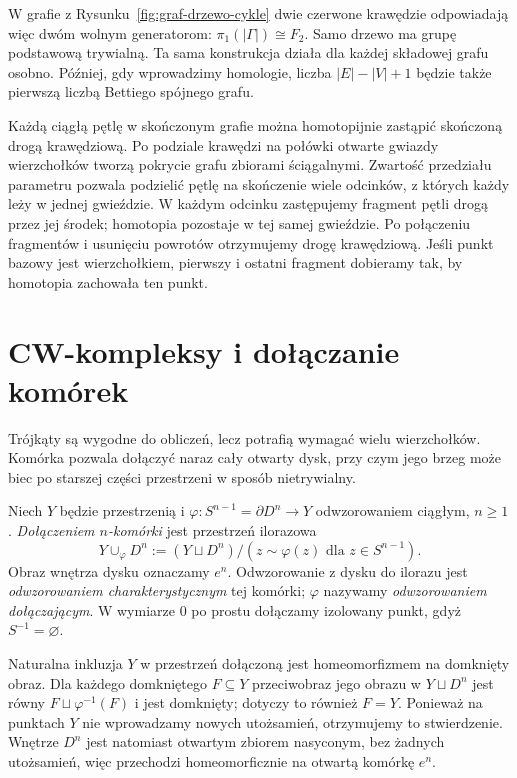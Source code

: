 W grafie z Rysunku~\ref{fig:graf-drzewo-cykle} dwie czerwone
krawędzie odpowiadają więc dwóm wolnym generatorom:
$\pi_1(|\Gamma|)\cong F_2$. Samo drzewo ma grupę
podstawową trywialną. Ta sama konstrukcja działa dla
każdej składowej grafu osobno. Później, gdy wprowadzimy
homologie, liczba $|E|-|V|+1$ będzie także pierwszą liczbą
Bettiego spójnego grafu.

Każdą ciągłą pętlę w skończonym grafie można homotopijnie
zastąpić skończoną drogą krawędziową. Po podziale krawędzi
na połówki otwarte gwiazdy wierzchołków tworzą pokrycie
grafu zbiorami ściągalnymi. Zwartość przedziału parametru
pozwala podzielić pętlę na skończenie wiele odcinków, z
których każdy leży w jednej gwieździe. W każdym odcinku
zastępujemy fragment pętli drogą przez jej środek; homotopia
pozostaje w tej samej gwieździe. Po połączeniu fragmentów
i usunięciu powrotów otrzymujemy drogę krawędziową.
Jeśli punkt bazowy jest wierzchołkiem, pierwszy i ostatni
fragment dobieramy tak, by homotopia zachowała ten punkt.

\section{CW-kompleksy i dołączanie komórek}
\label{sec:cw-kompleksy}

Trójkąty są wygodne do obliczeń, lecz
potrafią wymagać wielu wierzchołków.
Komórka pozwala dołączyć naraz cały
otwarty dysk, przy czym jego brzeg
może biec po starszej części przestrzeni
w sposób nietrywialny.

\begin{definicja}
\label{def:dolaczenie-komorki}
Niech $Y$ będzie przestrzenią i
$\varphi:S^{n-1}=\partial D^n\to Y$
odwzorowaniem ciągłym, $n\geq1$.
\emph{Dołączeniem $n$-komórki} jest
przestrzeń ilorazowa
\[
 Y\cup_\varphi D^n
 :=(Y\sqcup D^n)/(z\sim\varphi(z)
 \text{ dla }z\in S^{n-1}).
\]
Obraz wnętrza dysku oznaczamy $e^n$.
Odwzorowanie z dysku do ilorazu jest
\emph{odwzorowaniem charakterystycznym}
tej komórki; $\varphi$ nazywamy
\emph{odwzorowaniem dołączającym}.
W wymiarze $0$ po prostu dołączamy
izolowany punkt, gdyż
$S^{-1}=\varnothing$.
\end{definicja}

Naturalna inkluzja $Y$ w przestrzeń dołączoną jest
homeomorfizmem na domknięty obraz. Dla każdego domkniętego $F\subseteq Y$
przeciwobraz jego obrazu w $Y\sqcup D^n$ jest równy
$F\sqcup\varphi^{-1}(F)$ i jest domknięty; dotyczy to również $F=Y$.
Ponieważ na punktach $Y$ nie wprowadzamy nowych utożsamień,
otrzymujemy to stwierdzenie. Wnętrze $D^n$ jest natomiast
otwartym zbiorem nasyconym, bez żadnych utożsamień, więc przechodzi
homeomorficznie na otwartą komórkę $e^n$.

